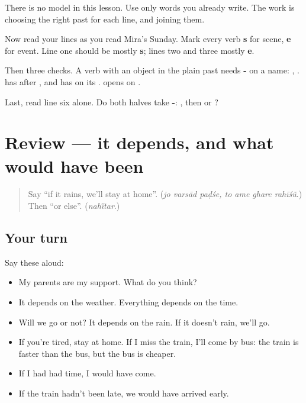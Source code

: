 There is no model in this lesson. Use only words you already write. The work is choosing the right past for each line, and joining them.

\begin{tcolorbox}[breakable,colback=teal!4,colframe=teal!35!black,title={Before you move on}]
Now read your lines as you read Mira's Sunday. Mark every verb \textbf{s} for scene, \textbf{e} for event. Line one should be mostly \textbf{s}; lines two and three mostly \textbf{e}.

Then three checks. A verb with an object in the plain past needs \textbf{-} on a name: \textbf{}, \textbf{}. \textbf{} has \textbf{} after \textbf{}, and \textbf{} has \textbf{} on its \textbf{}. \textbf{} opens on \textbf{}.

Last, read line six alone. Do both halves take \textbf{-}: \textbf{}, then \textbf{} or \textbf{}?
\end{tcolorbox}
\section[(review)]{Review — it depends, and what would have been}

\label{lesson:GU-R284-depends-and-would}



\begin{quote}
Say \textquotedblleft{}if it rains, we'll stay at home\textquotedblright{}. (\emph{jo varsād paḍśe, to ame ghare rahīśũ}.) Then \textquotedblleft{}or else\textquotedblright{}. (\emph{nahī̃tar}.)
\end{quote}

\subsection*{Your turn}
Say these aloud:

\begin{itemize}
\raggedright
  \item My parents are my support. What do you think?
  \item It depends on the weather. Everything depends on the time.
  \item Will we go or not? It depends on the rain. If it doesn't rain, we'll go.
  \item If you're tired, stay at home. If I miss the train, I'll come by bus: the train is faster than the bus, but the bus is cheaper.
  \item If I had had time, I would have come.
  \item If the train hadn't been late, we would have arrived early.
\end{itemize}

